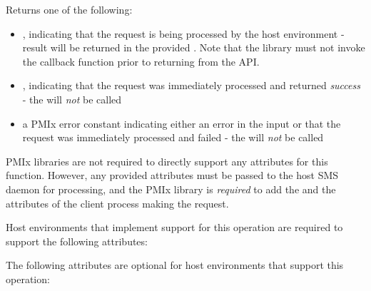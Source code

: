 \begin{arglist}
\end{arglist}

Returns one of the following:

\begin{itemize}
    \item {}, indicating that the request is being processed by the host environment - result will be returned in the provided . Note that the library must not invoke the callback function prior to returning from the \ac{API}.
    \item {}, indicating that the request was immediately processed and returned \textit{success} - the  will \textit{not} be called
    \item a PMIx error constant indicating either an error in the input or that the request was immediately processed and failed - the  will \textit{not} be called
\end{itemize}

\reqattrstart
\ac{PMIx} libraries are not required to directly support any attributes for this function. However, any provided attributes must be passed to the host \ac{SMS} daemon for processing, and the \ac{PMIx} library is \textit{required} to add the  and the  attributes of the client process making the request.

\divider

Host environments that implement support for this operation are required to support the following attributes:


\reqattrend

\optattrstart
The following attributes are optional for host environments that support this operation:


